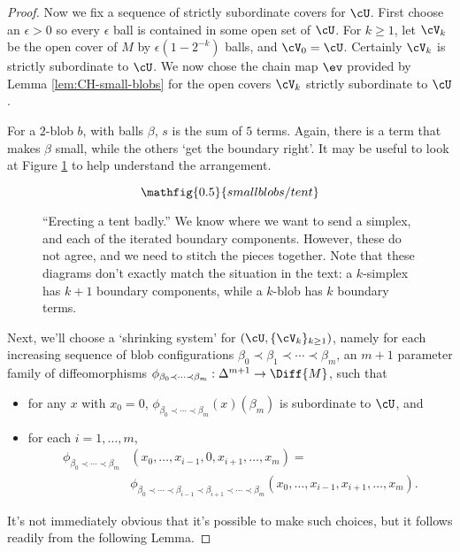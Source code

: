 \begin{proof}
Now we fix a sequence of strictly subordinate covers for $\cU$. First choose an $\epsilon > 0$ so every $\epsilon$ ball is contained in some open set of $\cU$. For $k \geq 1$, let $\cV_{k}$ be the open cover of $M$ by $\epsilon (1-2^{-k})$ balls, and $\cV_0 = \cU$. Certainly $\cV_k$ is strictly subordinate to $\cU$. We now chose the chain map $\ev$ provided by Lemma \ref{lem:CH-small-blobs} for the open covers $\cV_k$ strictly subordinate to $\cU$.

For a $2$-blob $b$, with balls $\beta$, $s$ is the sum of $5$ terms. Again, there is a term that makes $\beta$ small, while the others `get the boundary right'. It may be useful to look at Figure \ref{fig:erectly-a-tent-badly} to help understand the arrangement.
\begin{figure}[!ht]
$$\mathfig{0.5}{smallblobs/tent}$$
\caption{``Erecting a tent badly.'' We know where we want to send a simplex, and each of the iterated boundary components. However, these do not agree, and we need to stitch the pieces together. Note that these diagrams don't exactly match the situation in the text: a $k$-simplex has $k+1$ boundary components, while a $k$-blob has $k$ boundary terms.}
\label{fig:erectly-a-tent-badly}
\end{figure}

Next, we'll choose a `shrinking system' for $\left(\cU,\{\cV_k\}_{k \geq 1}\right)$, namely for each increasing sequence of blob configurations
$\beta_0 \prec \beta_1 \prec \cdots \prec \beta_m$, an $m+1$ parameter family of diffeomorphisms
$\phi_{\beta_0 \prec \cdots \prec \beta_m} : \Delta^{m+1} \to \Diff{M}$, such that
\begin{itemize}
\item for any $x$ with $x_0 = 0$, $\phi_{\beta_0 \prec \cdots \prec \beta_m}(x)(\beta_m)$ is subordinate to $\cU$, and
\item for each $i = 1, \ldots, m$,
\begin{align*}
\phi_{\beta_0 \prec \cdots \prec \beta_m}&(x_0, \ldots, x_{i-1},0,x_{i+1},\ldots,x_m) = \\ &\phi_{\beta_0 \prec \cdots \prec \beta_{i-1} \prec \beta_{i+1} \prec \cdots \prec \beta_m}(x_0,\ldots, x_{i-1},x_{i+1},\ldots,x_m).
\end{align*}
\end{itemize}
It's not immediately obvious that it's possible to make such choices, but it follows readily from the following Lemma.



\end{proof}
